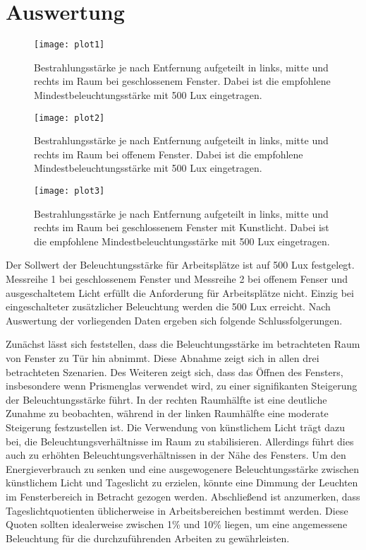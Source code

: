 \section{Auswertung}
\label{sec:Auswertung}
\begin{figure}[H]
    \centering
    \texttt{[image: plot1]}
    \caption{Bestrahlungsstärke je nach Entfernung aufgeteilt in links, mitte und rechts im Raum bei geschlossenem Fenster. Dabei ist die empfohlene  Mindestbeleuchtungsstärke mit 500 Lux eingetragen.}
    \label{fig:plot1_28062023}
  \end{figure}
  \newpage
  \begin{figure}[H]
    \centering
    \texttt{[image: plot2]}
    \caption{Bestrahlungsstärke je nach Entfernung aufgeteilt in links, mitte und rechts im Raum bei offenem Fenster. Dabei ist die empfohlene  Mindestbeleuchtungsstärke mit 500 Lux eingetragen. }
    \label{fig:plot2_28062023}
  \end{figure}
  \newpage
  \begin{figure}[H]
    \centering
    \texttt{[image: plot3]}
    \caption{Bestrahlungsstärke je nach Entfernung aufgeteilt in links, mitte und rechts im Raum bei geschlossenem Fenster mit Kunstlicht. Dabei ist die empfohlene  Mindestbeleuchtungsstärke mit 500 Lux eingetragen.}
    \label{fig:plot3_28062023}
  \end{figure}
  Der Sollwert der Beleuchtungsstärke für Arbeitsplätze ist auf 500 Lux festgelegt. Messreihe 1 bei geschlossenem Fenster und Messreihe 2 bei offenem Fenser und ausgeschaltetem Licht erfüllt die Anforderung für Arbeitsplätze nicht. Einzig bei eingeschalteter zusätzlicher Beleuchtung werden die 500 Lux erreicht.
Nach Auswertung der vorliegenden Daten ergeben sich folgende Schlussfolgerungen.

Zunächst lässt sich feststellen, dass die Beleuchtungsstärke im betrachteten Raum von Fenster zu Tür hin abnimmt. Diese Abnahme zeigt sich in allen drei betrachteten Szenarien.
Des Weiteren zeigt sich, dass das Öffnen des Fensters, insbesondere wenn Prismenglas verwendet wird, zu einer signifikanten Steigerung der Beleuchtungsstärke führt. In der rechten Raumhälfte ist eine deutliche Zunahme zu beobachten, während in der linken Raumhälfte eine moderate Steigerung festzustellen ist.
Die Verwendung von künstlichem Licht trägt dazu bei, die Beleuchtungsverhältnisse im Raum zu stabilisieren. Allerdings führt dies auch zu erhöhten Beleuchtungsverhältnissen in der Nähe des Fensters. Um den Energieverbrauch zu senken und eine ausgewogenere Beleuchtungsstärke zwischen künstlichem Licht und Tageslicht zu erzielen, könnte eine Dimmung der Leuchten im Fensterbereich in Betracht gezogen werden.
Abschließend ist anzumerken, dass Tageslichtquotienten üblicherweise in Arbeitsbereichen bestimmt werden. Diese Quoten sollten idealerweise zwischen 1\% und 10\% liegen, um eine angemessene Beleuchtung für die durchzuführenden Arbeiten zu gewährleisten.
\newpage
